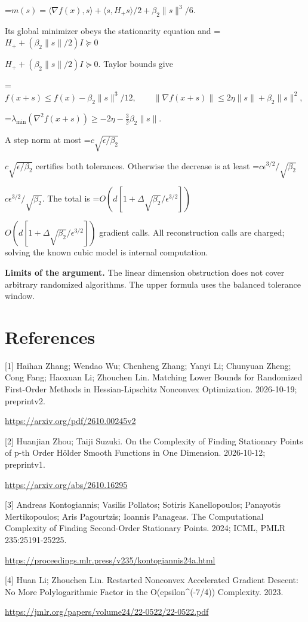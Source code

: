 \documentclass[10pt,a4paper]{article}
\newcommand{\AtlasMath}[1]{\par\begingroup\centering\setbox0=\hbox{$\displaystyle #1$}\ifdim\wd0>1.4\linewidth\typeout{ATLAS WIDE FORMULA: \the\wd0}\fi\ifdim\wd0>\linewidth\resizebox{\linewidth}{!}{\box0}\else\box0\fi\par\endgroup}
\newcommand{\AtlasInlineMath}[1]{\begingroup\setbox0=\hbox{$#1$}\ifdim\wd0>.4\linewidth\endgroup\AtlasMath{#1}\else\endgroup$#1$\fi}
\begin{document}
\AtlasMath{m(s)=\langle\nabla f(x),s\rangle+\langle s,H_+s\rangle/2
+\beta_2\|s\|^3/6.}

Its global minimizer obeys the stationarity equation and
\AtlasInlineMath{H_++(\beta_2\|s\|/2)I\succeq0}.
Taylor bounds give

\AtlasMath{f(x+s)\le f(x)-\beta_2\|s\|^3/12,\qquad
\|\nabla f(x+s)\|\le2\eta\|s\|+\beta_2\|s\|^2,}


\AtlasMath{\lambda_{\min}(\nabla^2f(x+s))\ge-2\eta-\tfrac32\beta_2\|s\|.}

A step norm at most \AtlasInlineMath{c\sqrt{\epsilon/\beta_2}} certifies both tolerances. Otherwise the decrease is at least \AtlasInlineMath{c\epsilon^{3/2}/\sqrt{\beta_2}}. The total is \AtlasInlineMath{O(d[1+\Delta\sqrt{\beta_2}/\epsilon^{3/2}])} gradient calls. All reconstruction calls are charged; solving the known cubic model is internal computation.

\textbf{Limits of the argument.} The linear dimension obstruction does not cover arbitrary randomized algorithms. The upper formula uses the balanced tolerance window.

\section{References}
[1] Haihan Zhang; Wendao Wu; Chenheng Zhang; Yanyi Li; Chunyuan Zheng; Cong Fang; Haoxuan Li; Zhouchen Lin. Matching Lower Bounds for Randomized First-Order Methods in Hessian-Lipschitz Nonconvex Optimization. 2026-10-19; preprintv2.

\url{https://arxiv.org/pdf/2610.00245v2}

[2] Huanjian Zhou; Taiji Suzuki. On the Complexity of Finding Stationary Points of p-th Order Hölder Smooth Functions in One Dimension. 2026-10-12; preprintv1.

\url{https://arxiv.org/abs/2610.16295}

[3] Andreas Kontogiannis; Vasilis Pollatos; Sotiris Kanellopoulos; Panayotis Mertikopoulos; Aris Pagourtzis; Ioannis Panageas. The Computational Complexity of Finding Second-Order Stationary Points. 2024; ICML, PMLR 235:25191-25225.

\url{https://proceedings.mlr.press/v235/kontogiannis24a.html}

[4] Huan Li; Zhouchen Lin. Restarted Nonconvex Accelerated Gradient Descent: No More Polylogarithmic Factor in the O(epsilon\textasciicircum{}(-7/4)) Complexity. 2023.

\url{https://jmlr.org/papers/volume24/22-0522/22-0522.pdf}
\end{document}

